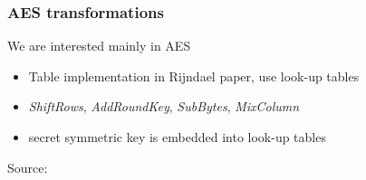 \documentclass{beamer}
\begin{document}
\begin{frame}
    \frametitle{AES transformations}
    We are interested mainly in AES
    \begin{itemize}
     \item Table implementation in Rijndael paper, use look-up tables
     \item \emph{ShiftRows}, \emph{AddRoundKey}, \emph{SubBytes}, \emph{MixColumn}
     \item secret symmetric key is embedded into look-up tables
    \end{itemize}
    \centerline{}
    \centerline{\hbox{\tiny Source:}}
\end{frame}
\end{document}
